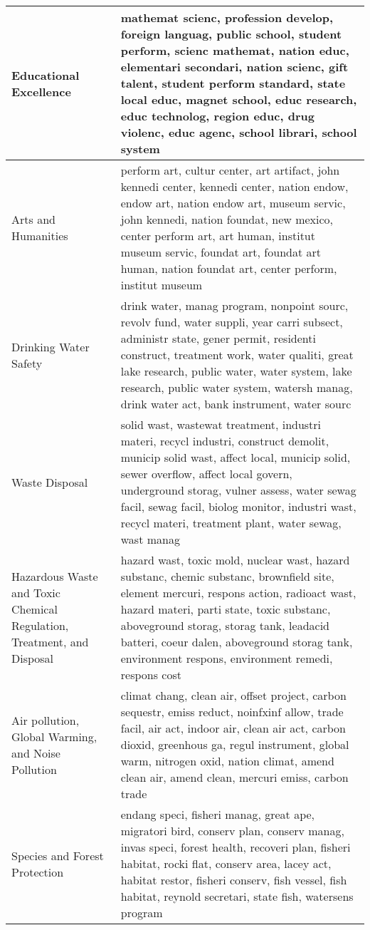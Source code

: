 \begin{longtable}{p{}p{}}
   \hline
Educational Excellence & mathemat scienc, profession develop, foreign languag, public school, student perform, scienc mathemat, nation educ, elementari secondari, nation scienc, gift talent, student perform standard, state local educ, magnet school, educ research, educ technolog, region educ, drug violenc, educ agenc, school librari, school system \\ 
   \hline
Arts and Humanities & perform art, cultur center, art artifact, john kennedi center, kennedi center, nation endow, endow art, nation endow art, museum servic, john kennedi, nation foundat, new mexico, center perform art, art human, institut museum servic, foundat art, foundat art human, nation foundat art, center perform, institut museum \\ 
   \hline
Drinking Water Safety & drink water, manag program, nonpoint sourc, revolv fund, water suppli, year carri subsect, administr state, gener permit, residenti construct, treatment work, water qualiti, great lake research, public water, water system, lake research, public water system, watersh manag, drink water act, bank instrument, water sourc \\ 
   \hline
Waste Disposal & solid wast, wastewat treatment, industri materi, recycl industri, construct demolit, municip solid wast, affect local, municip solid, sewer overflow, affect local govern, underground storag, vulner assess, water sewag facil, sewag facil, biolog monitor, industri wast, recycl materi, treatment plant, water sewag, wast manag \\ 
   \hline
Hazardous Waste and Toxic Chemical Regulation, Treatment, and Disposal & hazard wast, toxic mold, nuclear wast, hazard substanc, chemic substanc, brownfield site, element mercuri, respons action, radioact wast, hazard materi, parti state, toxic substanc, aboveground storag, storag tank, leadacid batteri, coeur dalen, aboveground storag tank, environment respons, environment remedi, respons cost \\ 
   \hline
Air pollution, Global Warming, and Noise Pollution & climat chang, clean air, offset project, carbon sequestr, emiss reduct, noinfxinf allow, trade facil, air act, indoor air, clean air act, carbon dioxid, greenhous ga, regul instrument, global warm, nitrogen oxid, nation climat, amend clean air, amend clean, mercuri emiss, carbon trade \\ 
   \hline
Species and Forest Protection & endang speci, fisheri manag, great ape, migratori bird, conserv plan, conserv manag, invas speci, forest health, recoveri plan, fisheri habitat, rocki flat, conserv area, lacey act, habitat restor, fisheri conserv, fish vessel, fish habitat, reynold secretari, state fish, watersens program \\ 

\end{longtable}
